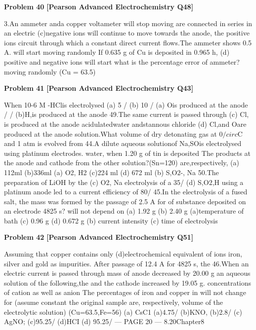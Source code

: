 \begin{problembox}
\textbf{Problem 40} \hfill \textbf{[Pearson Advanced Electrochemistry Q48]}
\label{q:ext-pearson-40}

3.An ammeter anda copper voltameter
will stop moving
are connected in series in an electric
(c)negative ions will continue to move
towards the anode, the positive ions
circuit through which a constant direct
current flows.The ammeter shows 0.5 A.
will start moving randomly
If 0.635 g of Cu is deposited in 0.965 h,
(d) positive and negative ions will start
what is the percentage error of ammeter?
moving randomly
(Cu = 63.5)
\end{problembox}

\begin{problembox}
\textbf{Problem 41} \hfill \textbf{[Pearson Advanced Electrochemistry Q43]}
\label{q:ext-pearson-41}

When 10-6 M -HClis electrolysed
(a) 5 /%
(b) 10 /%
(a) Ois produced at the anode
/%
/%
(b)H,is produced at the anode
49.The same current is passed through
(c) Cl, is produced at the anode
acidulatedwater andstannous chloride
(d) Cl,and Oare produced at the anode
solution.What volume of dry detonating
gas at 0$/circ$C and 1 atm is evolved from
44.A dilute aqueous solutionof Na,SOis
electrolysed using platinum electrodes.
water, when 1.20 g of tin is deposited
The products at the anode and cathode
from the other solution?(Sn=120)
are,respectively,
(a) 112ml
(b)336ml
(a) O2, H2
(c)224 ml
(d) 672 ml
(b) S,O$2$-, Na
50.The preparation of LiOH by the
(c) O2, Na
electrolysis of a 35/%
(d) S,O$2$,H
using a platinum anode led to a current
efficiency of 80/%
45.In the electrolysis of a fused salt, the mass
was formed by the passage of 2.5 A for
of substance deposited on an electrode
4825 s?
will not depend on
(a) 1.92 g
(b) 2.40 g
(a)temperature of bath
(c) 0.96 g
(d) 0.672 g
(b) current intensity
(c) time of electrolysis
\end{problembox}

\begin{problembox}
\textbf{Problem 42} \hfill \textbf{[Pearson Advanced Electrochemistry Q51]}
\label{q:ext-pearson-42}

Assuming that copper contains only
(d)electrochemical equivalent of ions
iron, silver and gold as impurities.
After passage of 12.4 A for 4825 s, the
46.When an electric current is passed through
mass of anode decreased by 20.00 g
an aqueous solution of the following,the
and the cathode increased by 19.05 g.
concentrations of cation as well as anion
The percentages of iron and copper in
will not change for (assume constant
the original sample are, respectively,
volume of the electrolytic solution)
(Cu=63.5,Fe=56)
(a) CsC1
(a)4.75/%
(b)KNO,
(b)2.8/%
(c) AgNO;
(c)95.25/%
(d)HCI
(d) 95.25/%
--- PAGE 20 ---
8.20Chapter8
\end{problembox}

